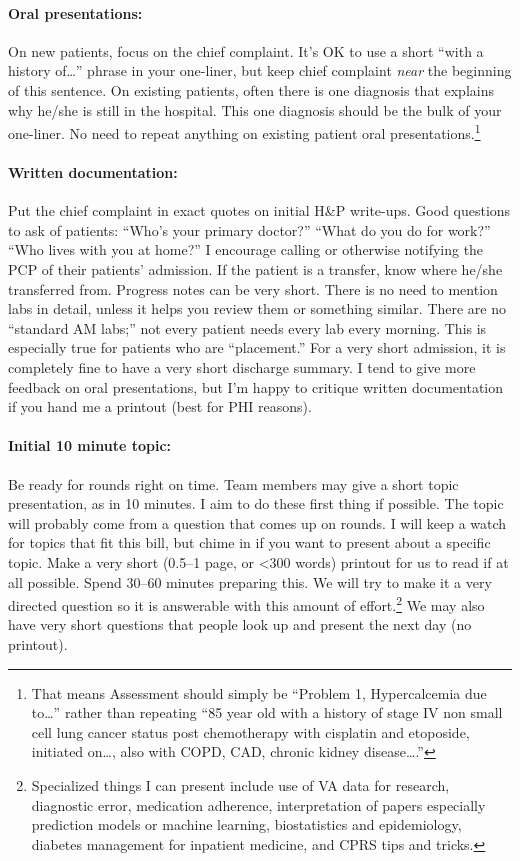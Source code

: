 \documentclass{tufte-handout}
\begin{document}
\paragraph{Oral presentations:} On new patients, focus on the chief
complaint. It's OK to use a short ``with a history of\ldots{}'' phrase
in your one-liner, but keep chief complaint \emph{near} the beginning
of this sentence. On existing patients, often there is one diagnosis
that explains why he/she is still in the hospital. This one diagnosis
should be the bulk of your one-liner. No need to repeat anything on
existing patient oral presentations.\footnote{That means Assessment
should simply be ``Problem 1, Hypercalcemia due to\ldots{}'' rather
than repeating ``85 year old with a history of stage IV non small cell
lung cancer status post chemotherapy with cisplatin and etoposide,
initiated on\ldots{}, also with COPD, CAD, chronic kidney
disease\ldots{}.''}

\paragraph{Written documentation:} Put the chief complaint in exact
quotes on initial H\&P write-ups. Good questions to ask of patients:
``Who's your primary doctor?'' ``What do you do for work?'' ``Who
lives with you at home?'' I encourage calling or otherwise notifying
the PCP of their patients' admission. If the patient is a transfer,
know where he/she transferred from. Progress notes can be very short.
There is no need to mention labs in detail, unless it helps you review
them or something similar. There are no ``standard AM labs;'' not
every patient needs every lab every morning. This is especially true
for patients who are ``placement.'' For a very short admission, it is
completely fine to have a very short discharge summary. I tend to give
more feedback on oral presentations, but I'm happy to critique written
documentation if you hand me a printout (best for PHI reasons).

\paragraph{Initial 10 minute topic:} Be ready for rounds right on time.
Team members may give a short topic presentation, as in 10 minutes. I
aim to do these first thing if possible. The topic will probably come
from a question that comes up on rounds. I will keep a watch for
topics that fit this bill, but chime in if you want to present about a
specific topic. Make a very short (0.5--1 page, or <300 words)
printout for us to read if at all possible. Spend 30--60 minutes
preparing this. We will try to make it a very directed question so it
is answerable with this amount of effort.\footnote{Specialized things
I can present include use of VA data for research, diagnostic error,
medication adherence, interpretation of papers especially prediction
models or machine learning, biostatistics and epidemiology, diabetes
management for inpatient medicine, and CPRS tips and tricks.} We may
also have very short questions that people look up and present the
next day (no printout).
\end{document}
